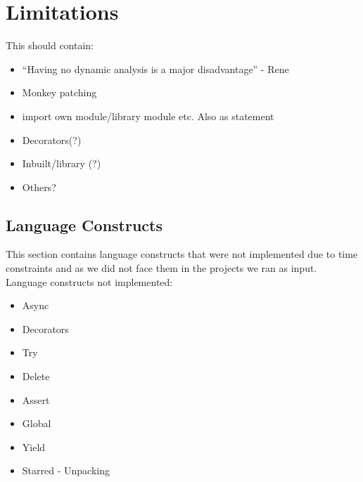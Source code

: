\section{Limitations}
This should contain:
\begin{itemize}
\item ``Having no dynamic analysis is a major disadvantage'' - Rene
\item Monkey patching
\item import own module/library module etc. Also as statement
\item Decorators(?)
\item Inbuilt/library (?)
\item Others?
\end{itemize}

\subsection{Language Constructs}
This section contains language constructs that were not implemented due to time constraints and as we did not face them in the projects we ran as input.
Language constructs not implemented:
\begin{itemize}
\item Async
\item Decorators
\item Try
\item Delete
\item Assert
\item Global
\item Yield
\item Starred - Unpacking
\end{itemize}

